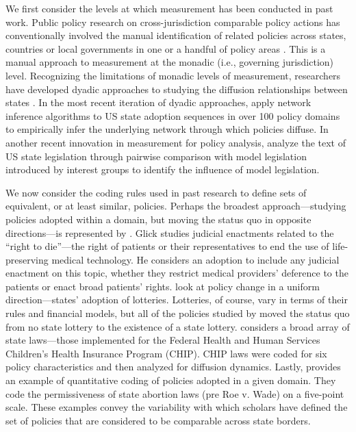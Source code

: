 \documentclass[12pt]{article} %
\begin{document}
We first consider the levels at which measurement has been conducted in past work. Public policy research on cross-jurisdiction comparable policy actions has conventionally involved the manual identification of related policies across states, countries or local governments in one or a handful of policy areas \citep[e.g., ][]{walker1969,berry1990,simmons2004,gilardi2009,krause2011policy}. This is a manual approach to measurement at the monadic (i.e., governing jurisdiction) level. Recognizing the limitations of monadic levels of measurement, researchers have developed dyadic approaches to studying the diffusion relationships between states \citep{volden2006,boehmke2009}. In the most recent iteration of dyadic approaches, \cite{desmarais2015} apply network inference algorithms to US state adoption sequences in over 100 policy domains to empirically infer the underlying network through which policies diffuse. In another recent innovation in measurement for policy analysis, \cite{garrett2015} analyze the text of US state legislation through pairwise comparison with model legislation introduced by interest groups to identify the influence of model legislation.
 
We now consider the coding rules used in past research to define sets of equivalent, or at least similar, policies. Perhaps the broadest approach---studying policies adopted within a domain, but moving the status quo in opposite directions---is represented by \citet{glick1992judicial}. Glick studies judicial enactments related to the ``right to die''---the right of patients or their representatives to end the use of life-preserving medical technology. He considers an adoption to include any judicial enactment on this topic, whether they restrict medical providers' deference to the patients or enact broad patients' rights.  \citet{berry1990} look at policy change in a uniform direction---states' adoption of lotteries. Lotteries, of course, vary in terms of their rules and financial models, but all of the policies studied by \citet{berry1990} moved the status quo from no state lottery to the existence of a state lottery. \citet{volden2006} considers a broad array of state laws---those implemented for the Federal Health and Human Services Children's Health Insurance Program (CHIP). CHIP laws were coded for six policy characteristics and then analyzed for diffusion dynamics. Lastly, \citet{mooney1995legislative} provides an example of quantitative coding of policies adopted in a given domain. They code the permissiveness of state abortion laws (pre Roe v. Wade) on a five-point scale. These examples convey the variability with which scholars have defined the set of policies that are considered to be comparable across state borders.
\end{document}
